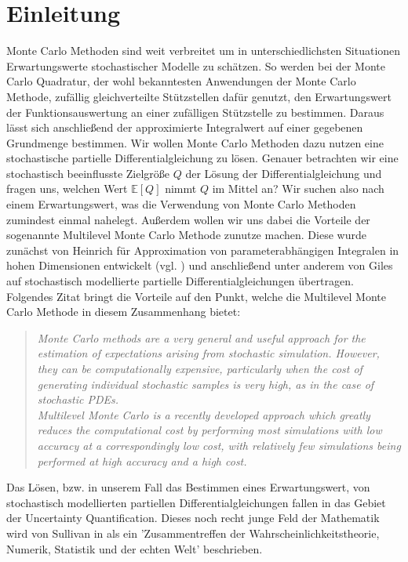 
\section{Einleitung}

Monte Carlo Methoden sind weit verbreitet um in unterschiedlichsten Situationen Erwartungswerte stochastischer Modelle zu schätzen.
So werden bei der Monte Carlo Quadratur, der wohl bekanntesten Anwendungen der Monte Carlo Methode, zufällig gleichverteilte Stützstellen dafür genutzt, den Erwartungswert der Funktionsauswertung an einer zufälligen Stützstelle zu bestimmen. Daraus lässt sich anschließend der approximierte Integralwert auf einer gegebenen Grundmenge bestimmen. 
Wir wollen Monte Carlo Methoden dazu nutzen eine stochastische partielle Differentialgleichung zu lösen. 
Genauer betrachten wir eine stochastisch beeinflusste Zielgröße $ Q $ der Lösung der Differentialgleichung und fragen uns, welchen Wert $ \mathbb{E}[Q] $ nimmt $ Q $ im Mittel an? Wir suchen also nach einem Erwartungswert, was die Verwendung von Monte Carlo Methoden zumindest einmal nahelegt. 
Außerdem wollen wir uns dabei die Vorteile der sogenannte Multilevel Monte Carlo Methode zunutze machen. Diese wurde zunächst von Heinrich für Approximation von parameterabhängigen Integralen in hohen Dimensionen entwickelt (vgl. \cite{heinrich2001multilevel}) und anschließend unter anderem von  Giles auf stochastisch modellierte partielle Differentialgleichungen übertragen. Folgendes Zitat bringt die Vorteile auf den Punkt, welche die Multilevel Monte Carlo Methode in diesem Zusammenhang bietet:
\begin{quote}
	\textit{Monte Carlo methods are a very general and useful approach for the estimation of expectations arising from stochastic simulation. However, they can be computationally expensive, particularly when the cost of generating individual stochastic samples is very high, as in the case of stochastic PDEs. \\ Multilevel Monte Carlo is a recently developed approach which greatly reduces the computational cost by performing most simulations with low accuracy at a correspondingly low cost, with relatively few simulations being performed at high accuracy and a high cost.}  \\
\end{quote}
Das Lösen, bzw. in unserem Fall das Bestimmen eines Erwartungswert, von stochastisch modellierten partiellen Differentialgleichungen fallen in das Gebiet der Uncertainty Quantification. Dieses noch recht junge Feld der Mathematik wird von Sullivan in \cite{sullivan2015introduction} als ein 'Zusammentreffen der Wahrscheinlichkeitstheorie, Numerik, Statistik und der echten Welt' beschrieben. \\

